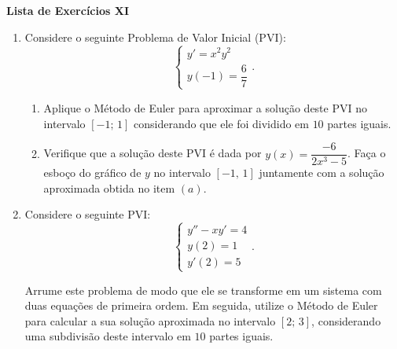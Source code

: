 \documentclass[10pt,a4paper]{article}
\begin{document}
\begin{center}
 \textbf{Lista de Exercícios XI}
\end{center}

\begin{enumerate}
  
  \item Considere o seguinte Problema de Valor Inicial (PVI):
  $$\begin{cases}
      y' = x^2y^2 \\
      y(-1) = \dfrac{6}{7}
    \end{cases}.
  $$
  \begin{enumerate}
    \item Aplique o Método de Euler para aproximar a solução deste PVI no intervalo $[-1;\, 1]$ considerando que ele foi dividido em $10$ 
          partes iguais.
    \item Verifique que a solução deste PVI é dada por $y(x) = \dfrac{-6}{2x^3 - 5}$. Faça o esboço do gráfico de $y$ no intervalo $[-1,\, 1]$ 
          juntamente com a solução aproximada obtida no item $(a)$.
  \end{enumerate}

   \item Considere o seguinte PVI:
  $$\begin{cases}
      y'' - xy' = 4 \\
      y(2) = 1 \\
      y'(2) = 5
    \end{cases}.
  $$
  
  Arrume este problema de modo que ele se transforme em um sistema com duas equações de primeira ordem. Em seguida, utilize o Método de Euler 
 para calcular a sua solução aproximada no intervalo $[2;\, 3]$, considerando uma subdivisão deste intervalo em $10$ partes iguais.

\end{enumerate}
\end{document}
